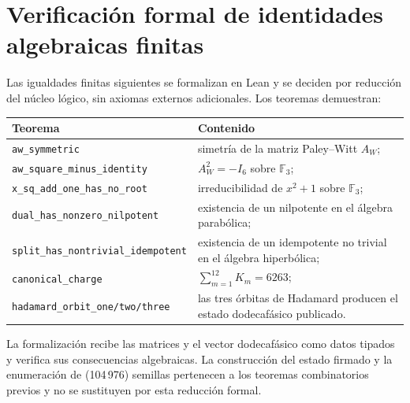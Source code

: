 \chapter{Verificación formal de identidades algebraicas finitas}
\label{app:lean}

Las igualdades finitas siguientes se formalizan en Lean y se deciden por
reducción del núcleo lógico, sin axiomas externos adicionales. Los teoremas
demuestran:
\begin{longtable}{p{}p{}}
\toprule
Teorema & Contenido\\
\midrule
\endhead
\texttt{aw\_symmetric}
& simetría de la matriz Paley--Witt \(A_W\);\\
\texttt{aw\_square\_minus\_identity}
& \(A_W^2=-I_6\) sobre \(\mathbb F_3\);\\
\texttt{x\_sq\_add\_one\_has\_no\_root}
& irreducibilidad de \(x^2+1\) sobre \(\mathbb F_3\);\\
\texttt{dual\_has\_nonzero\_nilpotent}
& existencia de un nilpotente en el álgebra parabólica;\\
\texttt{split\_has\_nontrivial\_idempotent}
& existencia de un idempotente no trivial en el álgebra hiperbólica;\\
\texttt{canonical\_charge}
& \(\sum_{m=1}^{12}K_m=6263\);\\
\texttt{hadamard\_orbit\_one/two/three}
& las tres órbitas de Hadamard producen el estado dodecafásico publicado.\\
\bottomrule
\end{longtable}

La formalización recibe las matrices y el vector dodecafásico como datos
tipados y verifica sus consecuencias algebraicas. La construcción del estado
firmado y la enumeración de (104\,976) semillas pertenecen a los teoremas
combinatorios previos y no se sustituyen por esta reducción formal.
